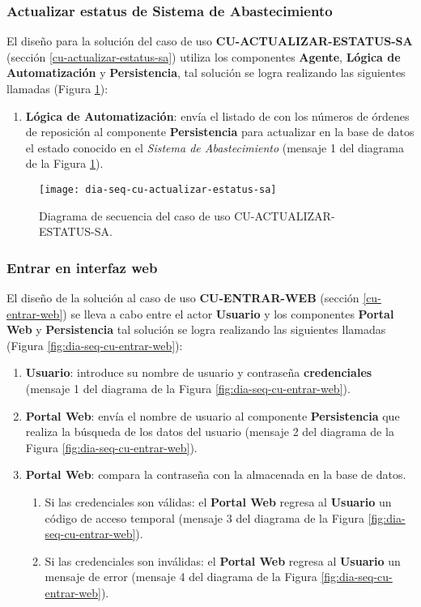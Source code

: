 \subsubsection{Actualizar estatus de Sistema de Abastecimiento}
El diseño para la solución del caso de uso \textbf{CU-ACTUALIZAR-ESTATUS-SA} (sección \ref{cu-actualizar-estatus-sa}) utiliza los componentes \textbf{Agente}, \textbf{Lógica de Automatización} y \textbf{Persistencia}, tal solución se logra realizando las siguientes llamadas (Figura \ref{fig:dia-seq-cu-actualizar-estatus-sa}):
\begin{enumerate}
	\item \textbf{Lógica de Automatización}: envía el listado de con los números de órdenes de reposición al componente \textbf{Persistencia} para actualizar en la base de datos el estado conocido en el \textit{Sistema de Abastecimiento} (mensaje 1 del diagrama de la Figura \ref{fig:dia-seq-cu-actualizar-estatus-sa}).
\end{enumerate}

\begin{figure}[h]
	\centering
	\texttt{[image: dia-seq-cu-actualizar-estatus-sa]}
	\caption{Diagrama de secuencia del caso de uso CU-ACTUALIZAR-ESTATUS-SA.}
	\label{fig:dia-seq-cu-actualizar-estatus-sa}
\end{figure}

\pagebreak
\subsubsection{Entrar en interfaz web}
El diseño de la solución al caso de uso \textbf{CU-ENTRAR-WEB} (sección \ref{cu-entrar-web}) se lleva a cabo entre el actor \textbf{Usuario} y los componentes \textbf{Portal Web} y \textbf{Persistencia} tal solución se logra realizando las siguientes llamadas (Figura \ref{fig:dia-seq-cu-entrar-web}):
\begin{enumerate}
	\item \textbf{Usuario}: introduce su nombre de usuario y contraseña \textbf{credenciales} (mensaje 1 del diagrama de la Figura \ref{fig:dia-seq-cu-entrar-web}).
	\item \textbf{Portal Web}: envía el nombre de usuario al componente \textbf{Persistencia} que realiza la búsqueda de los datos del usuario (mensaje 2 del diagrama de la Figura \ref{fig:dia-seq-cu-entrar-web}).
	\item \textbf{Portal Web}: compara la contraseña con la almacenada en la base de datos.
	\begin{enumerate}
		\item Si las credenciales son válidas: el \textbf{Portal Web} regresa al \textbf{Usuario} un código de acceso temporal (mensaje 3 del diagrama de la Figura \ref{fig:dia-seq-cu-entrar-web}).
		\item Si las credenciales son inválidas: el \textbf{Portal Web} regresa al \textbf{Usuario} un mensaje de error (mensaje 4 del diagrama de la Figura \ref{fig:dia-seq-cu-entrar-web}).
	\end{enumerate}
\end{enumerate}

